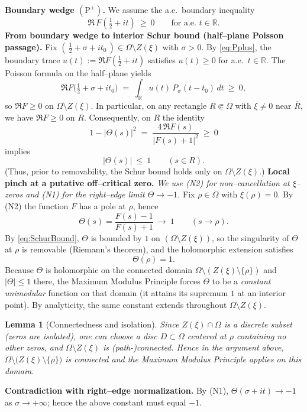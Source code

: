 \documentclass[11pt]{article}
\newtheorem{lemma}[theorem]{Lemma}
\theoremstyle{definition}
\theoremstyle{remark}
\begin{document}
\noindent\textbf{Boundary wedge $(\mathrm{P}^+)$.}
We assume the a.e.\ boundary inequality
\[
\Re\,F\!\left(\tfrac12+it\right)\ \ge\ 0\qquad\text{for a.e.\ }t\in\mathbb R.
\tag{P+}
\label{eq:Pplus}
\]
\medskip
\noindent\textbf{From boundary wedge to interior Schur bound (half--plane Poisson passage).}
Fix $(\,\tfrac12+\sigma+it_0\,)\in\Omega\setminus Z(\xi)$ with $\sigma>0$.
By \eqref{eq:Pplus}, the boundary trace $u(t):=\Re F(\tfrac12+it)$ satisfies $u(t)\ge 0$ for a.e.\ $t\in\mathbb R$.
The Poisson formula on the half--plane yields
\[
\Re F\big(\tfrac12+\sigma+it_0\big)
\;=\;\int_{\mathbb R} u(t)\,P_\sigma(t-t_0)\,dt\ \ge\ 0,
\]
so $\Re F\ge 0$ on $\Omega\setminus Z(\xi)$.
In particular, on any rectangle $R\Subset\Omega$ with $\xi\neq 0$ near $\overline R$, we have $\Re F\ge 0$ on $R$.
Consequently, on $R$ the identity
\[
1-|\Theta(s)|^2\;=\;\frac{4\,\Re F(s)}{|F(s)+1|^2}\ \ge\ 0
\]
implies
\[
|\Theta(s)|\ \le\ 1\qquad(s\in R).
\tag{Schur}
\label{eq:SchurBound}
\]
\noindent(Thus, prior to removability, the Schur bound holds only on $\Omega\setminus Z(\xi)$.)
\medskip
\noindent\textbf{Local pinch at a putative off--critical zero.}
\emph{We use (N2) for non--cancellation at $\xi$--zeros and (N1) for the right--edge limit $\Theta\to-1$.}
Fix $\rho\in\Omega$ with $\xi(\rho)=0$.
By (N2) the function $F$ has a pole at $\rho$, hence
\[
\Theta(s)=\frac{F(s)-1}{F(s)+1}\ \longrightarrow\ 1\qquad(s\to\rho).
\]
By \eqref{eq:SchurBound}, $\Theta$ is bounded by $1$ on $(\Omega\setminus Z(\xi))$,
so the singularity of $\Theta$ at $\rho$ is removable (Riemann's theorem), and the holomorphic extension satisfies
\[
\Theta(\rho)=1.
\]
Because $\Theta$ is holomorphic on the connected domain $\Omega\setminus(Z(\xi)\setminus\{\rho\})$
and $|\Theta|\le1$ there, the Maximum Modulus Principle forces $\Theta$ to be
a \emph{constant unimodular} function on that domain (it attains its supremum $1$ at an interior point).
By analyticity, the same constant extends throughout $\Omega\setminus Z(\xi)$.
\medskip
\begin{lemma}[Connectedness and isolation]\label{rem:connectedness}
Since $Z(\xi)\cap\Omega$ is a discrete subset (zeros are isolated), one can choose a disc $D\subset\Omega$ centered at $\rho$ containing no other zeros, and $\Omega\setminus Z(\xi)$ is (path-)connected. Hence in the argument above, $\Omega\setminus\big(Z(\xi)\setminus\{\rho\}\big)$ is connected and the Maximum Modulus Principle applies on this domain.
\end{lemma}
\noindent\textbf{Contradiction with right--edge normalization.}
By (N1), $\Theta(\sigma+it)\to-1$ as $\sigma\to+\infty$; hence the above constant must equal $-1$.
\end{document}
